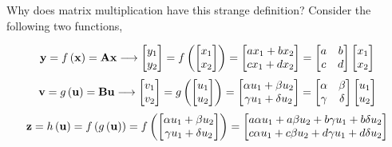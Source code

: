 \documentclass[aspectratio=169]{beamer}
\def\mf{\ensuremath\mathbf}
\def\lp{\ensuremath\left(}
\def\rp{\ensuremath\right)}
\begin{document}
\begin{frame}[t]{Why does matrix multiplication have this strange definition?}
Consider the following two functions,
\begin{small}
\[ \mf{y} = f\lp\mf{x}\rp = \mf{A}\mf{x} \longrightarrow \begin{bmatrix}y_1 \\ y_2\end{bmatrix} = f\left(\begin{bmatrix}x_1 \\ x_2\end{bmatrix}\right) = \begin{bmatrix}ax_1 + bx_2 \\ cx_1 + dx_2\end{bmatrix} = \begin{bmatrix}a & b \\ c & d\end{bmatrix}\begin{bmatrix}x_1 \\ x_2\end{bmatrix}\]
\[ \mf{v} = g\lp\mf{u}\rp = \mf{B}\mf{u} \longrightarrow \begin{bmatrix}v_1 \\ v_2\end{bmatrix} = g\left(\begin{bmatrix}u_1 \\ u_2\end{bmatrix}\right) = \begin{bmatrix}\alpha u_1 + \beta u_2 \\ \gamma u_1 + \delta u_2\end{bmatrix} = \begin{bmatrix}\alpha & \beta \\ \gamma & \delta\end{bmatrix}\begin{bmatrix}u_1 \\ u_2\end{bmatrix}\]
\[ \begin{split}
\mf{z} = h\left(\mf{u}\right) &= f\left(g\left(\mf{u}\right)\right) = f\left(\begin{bmatrix}\alpha u_1 + \beta u_2 \\ \gamma u_1 + \delta u_2\end{bmatrix}\right) = \begin{bmatrix}a\alpha u_1 + a\beta u_2 + b\gamma u_1 + b\delta u_2 \\ c\alpha u_1 + c\beta u_2 + d\gamma u_1 + d\delta u_2 \end{bmatrix}\\

\end{split}\]
\end{small}
\end{frame}
\end{document}
